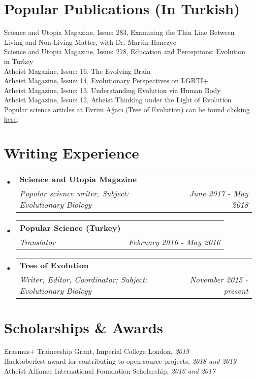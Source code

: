 \documentclass[letterpaper,11pt]{article}
\makeatletter
\newcommand{\resumeSubheading}[4]{
  \vspace{-1pt}\item
    \begin{tabular*}{0.97\textwidth}{l@{\extracolsep{\fill}}r}
      \textbf{#1} & #2 \\
      \textit{\small#3} & \textit{\small #4} \\
    \end{tabular*}\vspace{-5pt}
}
\newcommand{\resumeSubHeadingListStart}{\begin{itemize}[leftmargin=*]}
\newcommand{\resumeSubHeadingListEnd}{\end{itemize}}
\makeatother
\begin{document}
\section{Popular Publications (In Turkish)}
Science and Utopia Magazine, Issue: 283, Examining the Thin Line Between Living and Non-Living Matter, with Dr. Martin Hanczyc \\
Science and Utopia Magazine, Issue: 278, Education and Perceptions: Evolution in Turkey \\
Atheist Magazine, Issue: 16, The Evolving Brain \\
Atheist Magazine, Issue: 14, Evolutionary Perspectives on LGBTI+ \\
Atheist Magazine, Issue: 13, Understanding Evolution via Human Body \\
Atheist Magazine, Issue: 12, Atheist Thinking under the Light of Evolution \\
Popular science articles at Evrim A\u{g}ac{\i} (Tree of Evolution) can be found  \href{https://evrimagaci.org/isinaltinkaya/}{clicking here}. 

\section{Writing Experience}
  \resumeSubHeadingListStart
    \resumeSubheading
      {Science and Utopia Magazine}{ }
      {Popular science writer, Subject: Evolutionary Biology}{June 2017 - May 2018}
    \resumeSubheading
      {Popular Science (Turkey)}{ }
      {Translator}{February 2016 - May 2016}
    \resumeSubheading
      {\href{https://evrimagaci.org/isinaltinkaya/}{Tree of Evolution}}{}
      {Writer, Editor, Coordinator; Subject: Evolutionary Biology}{November 2015 - present}
  \resumeSubHeadingListEnd


\section{Scholarships \& Awards}
Erasmus+ Traineeship Grant, Imperial College London, \textit{2019} \\
Hacktoberfest award for contributing to open source projects, \textit{2018 and 2019} \\
Atheist Alliance International Foundation Scholarship, \textit{2016 and 2017} \\


\end{document}

